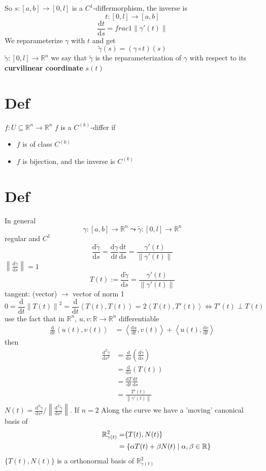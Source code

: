 \documentclass{book}
\newcommand{\norm}[1]{\left\lVert #1 \right\rVert}
\begin{document}
So $s:[a,b]\rightarrow[0,l]$ is a $C^1$-differmorphism, the inverse is $$t:[0,l]\rightarrow[a,b]$$$$\frac{\text{d}t}{\text{d}s}=frac{1}{\norm{\gamma'(t)}}$$
We reparameterize $\gamma$ with $t$ and get
$$\tilde{\gamma}(s)=(\gamma\circ t)(s)$$
$\tilde{\gamma}:[0,l]\rightarrow\mathbb{R}^n$ we say that $\tilde{\gamma}$ is the reparameterization of $\gamma$ with respect to its \textbf{curvilinear coordinate} $s(t)$
\section{Def}
$f:U\subseteq\mathbb{R}^n\rightarrow\mathbb{R}^n$ $f$ is a $C^{(k)}$-differ if \begin{itemize}
    \item $f$ is of class $C^{(k)}$
    \item $f$ is bijection, and the inverse is $C^{(k)}$
\end{itemize}
\section{Def}
In general $$\gamma:[a,b]\rightarrow\mathbb{R}^n\leadsto \tilde{\gamma}:[0,l]\rightarrow\mathbb{R}^n$$
regular and $C^1$
$$\frac{\text{d}\tilde{\gamma}}{\text{d}s}=\frac{\text{d}\gamma}{\text{d}t}\frac{\text{d}t}{\text{d}s}=\frac{\gamma'(t)}{\norm{\gamma'(t)}}$$
$\norm{\frac{\text{d}\tilde{\gamma}}{\text{d}s}}=1$
$$T(t):=\frac{\text{d}\tilde{\gamma}}{\text{d}s}=\frac{\gamma'(t)}{\norm{\gamma'(t)}}$$
tangent: (vector) $\rightarrow$ vector of norm 1
$$0=\frac{\text{d}}{\text{d}t}\norm{T(t)}^2=\frac{\text{d}}{\text{d}t}\left<T(t),T(t)\right>=2\left<T(t),T'(t)\right>\Leftrightarrow T'(t)\perp T(t)$$
use the fact that in $\mathbb{R}^n$, $u,v:\mathbb{R}\rightarrow\mathbb{R}^n$ differentiable
$$\begin{aligned}
    \frac{\text{d}}{\text{d}t}\left<u(t),v(t)\right> &= \left<\frac{\text{d}u}{\text{d}t},v(t)\right>+\left<u(t),\frac{\text{d}v}{\text{d}t}\right>
\end{aligned}$$
then
$$
\begin{aligned}
    \frac{\text{d}^2\tilde{\gamma}}{\text{d}s^2}&=\frac{\text{d}}{\text{d}s}(\frac{\text{d}\tilde{\gamma}}{\text{d}s})\\
    &=\frac{\text{d}}{\text{d}s}(T(t))\\
    &=\frac{\text{d}T}{\text{d}t}\frac{\text{d}t}{\text{d}s}\\
    &=\frac{T'(t)}{\norm{\gamma'(t)}}    
\end{aligned}$$
$N(t)=\frac{\text{d}^2\tilde{\gamma}}{\text{d}s^2}/\norm{\frac{\text{d}^2\tilde{\gamma}}{\text{d}s^2}}$. If $n=2$
Along the curve we have a 'moving' canonical basis of 
$$\begin{aligned}
    \mathbb{R}^2_{\gamma(t)}&=\span\{T(t),N(t)\}\\
    &=\{\alpha T(t)+\beta N(t)\mid\alpha,\beta\in \mathbb{R}\}
\end{aligned}$$
$\{T(t),N(t)\}$ is a orthonormal basis of $\mathbb{R}^2_{\gamma(t)}$
\end{document}
